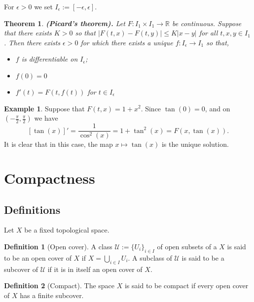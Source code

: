 \documentclass[11pt,a4paper]{article}
\theoremstyle{definition}
\newtheorem{definition}{Definition}[section]
\newtheorem{example}{Example}[section]
\theoremstyle{plain}
\newtheorem{theorem}{Theorem}[section]
\newcommand{\R}{\mathbb{R}}
\newcommand{\abs}[1]{\left\lvert #1\right\rvert}
\renewcommand{\tt}[1]{\textnormal{\textbf{(#1).}}} %
\begin{document}
  For $\epsilon > 0$ we set $I_\epsilon := [-\epsilon, \epsilon]$.

  \begin{theorem}
    \tt{Picard's theorem}
    Let $F \colon I_1 \times I_1 \to \R$ be continuous. Suppose that there 
    exists $K > 0$ so that $\abs{F(t,x) - F(t,y)} \le K\abs{x - y}$ for all 
    $t, x, y \in I_1$. Then there exists $\epsilon > 0$ for which there 
    exists a unique $f \colon I_{\epsilon} \to I_{1}$ so that,
    \begin{itemize}
      \item $f$ is differentiable on $I_{\epsilon}$;
      \item $f(0)=0$
      \item $f'(t) = F(t,f(t))$ for $t \in I_{\epsilon}$
    \end{itemize}
  \end{theorem}
  \begin{example}
    Suppose that $F(t,x) = 1 + x^2$. Since $\tan(0) = 0$, and on 
    $\left(- \frac{\pi}{2}, \frac{\pi}{2}\right)$ we have
    \[
      [\tan(x)]' = \frac{1}{\cos^2(x)} = 1 + \tan^2(x) = F(x,\tan(x)).
    \]
    It is clear that in this case, the map $x \mapsto \tan(x)$ is the unique
    solution.
  \end{example}

  \newpage

  \section{Compactness}\label{sec:compactness}

  \subsection{Definitions}

  Let $X$ be a fixed topological space.
  \begin{definition}[Open cover]
    A class $\mathcal{U} := \{U_i\}_{i \in I}$ of open subsets of a
    $X$ is said to be an open cover of $X$ if 
    $X = \bigcup_{i \in I} U_i$. A subclass of $\mathcal{U}$ is said
    to be a subcover of $\mathcal{U}$ if it is in itself an open cover
    of $X$.
  \end{definition}

  \begin{definition}[Compact]
    The space $X$ is said to be compact if every open cover of $X$
    has a finite subcover.
  \end{definition}
\end{document}
